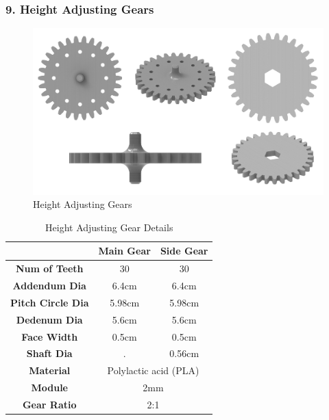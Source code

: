 \documentclass[12pt,a4paper,oneside]{book}
\begin{document}
			\subsubsection*{9. Height Adjusting Gears}
				\begin{figure}[H]
					\centering					
					\includegraphics[scale=0.8]{H_ADJUST GEARS FULL}
					\caption{Height Adjusting Gears}	 
				\end{figure}
				\begin{table}[H]
				\centering
				\def\arraystretch{1.5}
					\caption{Height Adjusting Gear Details}
					\vspace{0.5cm}
					\begin{tabular}{|c||c|c|}
					\hline
						\textbf{} & \textbf{Main Gear} & \textbf{Side Gear}\\\hline
						\textbf{Num of Teeth} & 30 & 30\\\hline
						\textbf{Addendum Dia} & 6.4cm & 6.4cm\\\hline
						\textbf{Pitch Circle Dia} & 5.98cm & 5.98cm\\\hline
						\textbf{Dedenum Dia} & 5.6cm & 5.6cm\\\hline
						\textbf{Face Width} & 0.5cm & 0.5cm\\\hline
						\textbf{Shaft Dia} & . & 0.56cm\\\hline
						\textbf{Material} & \multicolumn{2}{|c|}{Polylactic acid (PLA)}\\\hline
						\textbf{Module} & \multicolumn{2}{|c|}{2mm}\\\hline
						\textbf{Gear Ratio} & \multicolumn{2}{|c|}{2:1}\\\hline
					\end{tabular}
				\end{table}
				\pagebreak
				
\end{document}
